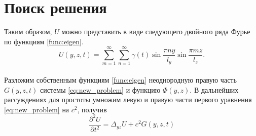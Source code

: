 \section{Поиск решения}

Таким образом, $U$ можно представить в виде следующего двойного ряда Фурье по функциям \eqref{func:eigen}.
\begin{equation}
  \label{eq:u-series}
  U(y, z, t) = \displaystyle \sum_{m=1}^{\infty}\sum_{n=1}^{\infty} \gamma(t) \sin\frac{\pi n y}{l_y} \sin\frac{\pi m z}{l_z}.
\end{equation}
\\
Разложим собственным функциям \eqref{func:eigen} неоднородную правую часть $G(y, z, t)$ системы \eqref{eq:new_problem} и функцию $\Phi(y, z)$. В дальнейших рассуждениях для простоты умножим левую и правую части первого уравнения \eqref{eq:new_problem} на $c^2$, получив
\[
\frac{\partial^2 U}{\partial t^2} = \Delta_{yz} U + c^2G(y, z, t)
\]


